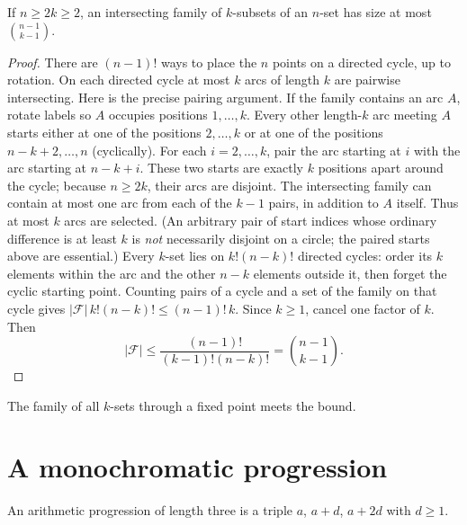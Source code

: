 \begin{theorem}\label{thm:ekr}
If $n\ge 2k\ge2$, an intersecting family of $k$-subsets of an $n$-set has size at most $\binom{n-1}{k-1}$.
\end{theorem}
\begin{proof}
There are $(n-1)!$ ways to place the $n$ points on a directed cycle, up to rotation. On each directed cycle at most $k$ arcs of length $k$ are pairwise intersecting. Here is the precise pairing argument. If the family contains an arc $A$, rotate labels so $A$ occupies positions $1,\ldots,k$. Every other length-$k$ arc meeting $A$ starts either at one of the positions $2,\ldots,k$ or at one of the positions $n-k+2,\ldots,n$ (cyclically). For each $i=2,\ldots,k$, pair the arc starting at $i$ with the arc starting at $n-k+i$. These two starts are exactly $k$ positions apart around the cycle; because $n\ge2k$, their arcs are disjoint. The intersecting family can contain at most one arc from each of the $k-1$ pairs, in addition to $A$ itself. Thus at most $k$ arcs are selected. (An arbitrary pair of start indices whose ordinary difference is at least $k$ is \emph{not} necessarily disjoint on a circle; the paired starts above are essential.) Every $k$-set lies on $k!(n-k)!$ directed cycles: order its $k$ elements within the arc and the other $n-k$ elements outside it, then forget the cyclic starting point. Counting pairs of a cycle and a set of the family on that cycle gives $|\mathcal F|\,k!(n-k)!\le(n-1)!\,k$. Since $k\ge1$, cancel one factor of $k$. Then
\[
 |\mathcal F|\le\frac{(n-1)!}{(k-1)!(n-k)!}=\binom{n-1}{k-1}.
\]
\end{proof}

The family of all $k$-sets through a fixed point meets the bound.

\section{A monochromatic progression}

An arithmetic progression of length three is a triple $a$, $a+d$, $a+2d$ with $d\ge1$.

